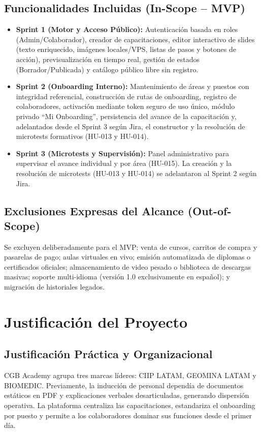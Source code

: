\documentclass[11pt,a4paper]{article}
\begin{document}
\subsection{Funcionalidades Incluidas (In-Scope -- MVP)}
\begin{itemize}[leftmargin=*]
    \item \textbf{Sprint 1 (Motor y Acceso Público):} Autenticación basada en roles (Admin/Colaborador), creador de capacitaciones, editor interactivo de slides (texto enriquecido, imágenes locales/VPS, listas de pasos y botones de acción), previsualización en tiempo real, gestión de estados (Borrador/Publicada) y catálogo público libre sin registro.
    \item \textbf{Sprint 2 (Onboarding Interno):} Mantenimiento de áreas y puestos con integridad referencial, construcción de rutas de onboarding, registro de colaboradores, activación mediante token seguro de uso único, módulo privado ``Mi Onboarding'', persistencia del avance de la capacitación y, adelantados desde el Sprint 3 según Jira, el constructor y la resolución de microtests formativos (HU-013 y HU-014).
    \item \textbf{Sprint 3 (Microtests y Supervisión):} Panel administrativo para supervisar el avance individual y por área (HU-015). La creación y la resolución de microtests (HU-013 y HU-014) se adelantaron al Sprint 2 según Jira.
\end{itemize}

\subsection{Exclusiones Expresas del Alcance (Out-of-Scope)}
Se excluyen deliberadamente para el MVP: venta de cursos, carritos de compra y pasarelas de pago; aulas virtuales en vivo; emisión automatizada de diplomas o certificados oficiales; almacenamiento de video pesado o biblioteca de descargas masivas; soporte multi-idioma (versión 1.0 exclusivamente en español); y migración de historiales legados.

\section{Justificación del Proyecto}
\subsection{Justificación Práctica y Organizacional}
CGB Academy agrupa tres marcas líderes: CIIP LATAM, GEOMINA LATAM y BIOMEDIC. Previamente, la inducción de personal dependía de documentos estáticos en PDF y explicaciones verbales desarticuladas, generando dispersión operativa. La plataforma centraliza las capacitaciones, estandariza el onboarding por puesto y permite a los colaboradores dominar sus funciones desde el primer día.
\end{document}
